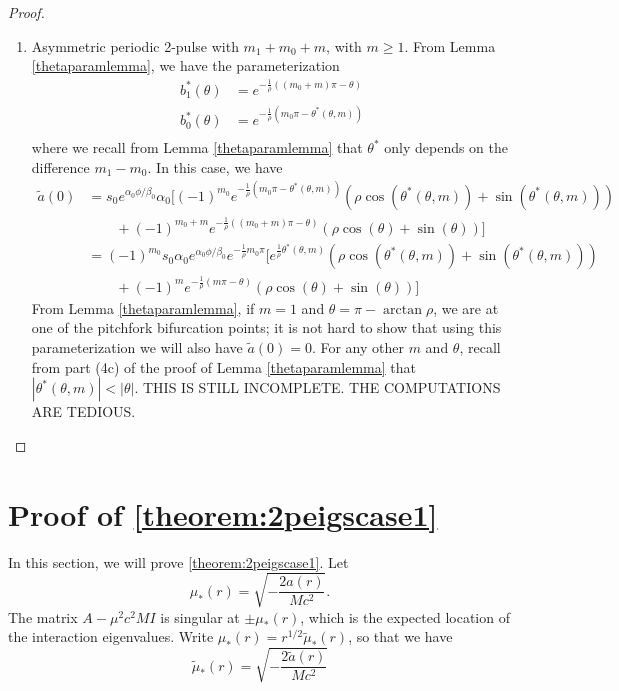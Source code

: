 \documentclass[thesis.tex]{subfiles}
\begin{document}
\begin{lemma}
\begin{proof}
\begin{enumerate}
\item Asymmetric periodic 2-pulse with $m_1 + m_0 + m$, with $m \geq 1$. From Lemma \ref{thetaparamlemma}, we have the parameterization
\begin{equation*}
\begin{aligned}
b_1^*(\theta) &= e^{-\frac{1}{\rho}((m_0 + m) \pi - \theta) } \\
b_0^*(\theta) &= e^{-\frac{1}{\rho}(m_0 \pi - \theta^*(\theta, m)) } \\
\end{aligned}
\end{equation*}
where we recall from Lemma \ref{thetaparamlemma} that $\theta^*$ only depends on the difference $m_1 - m_0$. In this case, we have
\begin{align*}
\tilde{a}(0) &= s_0 e^{\alpha_0 \phi/\beta_0} \alpha_0 \Big[ (-1)^{m_0} e^{-\frac{1}{\rho}(m_0 \pi - \theta^*(\theta, m))} \left( \rho \cos(\theta^*(\theta, m)) + \sin(\theta^*(\theta, m)) \right) \\
&\qquad + (-1)^{m_0 + m} e^{-\frac{1}{\rho}((m_0 + m) \pi - \theta) } ( \rho \cos(\theta) + \sin (\theta)) \Big] \\
&= (-1)^{m_0} s_0 \alpha_0 e^{\alpha_0 \phi/\beta_0} e^{-\frac{1}{\rho} m_0 \pi} \Big[ e^{\frac{1}{\rho} \theta^*(\theta, m)} \left( \rho \cos(\theta^*(\theta, m)) + \sin(\theta^*(\theta, m)) \right) \\
&\qquad + (-1)^{m} e^{-\frac{1}{\rho}(m \pi - \theta) } ( \rho \cos(\theta) + \sin (\theta)) \Big]
\end{align*}
From Lemma \ref{thetaparamlemma}, if $m = 1$ and $\theta = \pi - \arctan \rho$, we are at one of the pitchfork bifurcation points; it is not hard to show that using this parameterization we will also have $\tilde{a}(0) = 0$. For any other $m$ and $\theta$, recall from part (4c) of the proof of Lemma \ref{thetaparamlemma} that $|\theta^*(\theta, m)| < |\theta|$. 
THIS IS STILL INCOMPLETE. THE COMPUTATIONS ARE TEDIOUS.
\end{enumerate}
\end{proof}
\end{lemma}

\section{Proof of \cref{theorem:2peigscase1}}

In this section, we will prove \cref{theorem:2peigscase1}. Let
\begin{equation}\label{2pmustar}
\mu_*(r) = \sqrt{-\frac{2a(r)}{M c^2}}.
\end{equation}
The matrix $A - \mu^2 c^2 M I$ is singular at $\pm \mu_*(r)$, which is the expected location of the interaction eigenvalues. Write $\mu_*(r) = r^{1/2} \tilde{\mu}_*(r)$, so that we have
\begin{equation}\label{2ptildemustar}
\tilde{\mu}_*(r) = \sqrt{-\frac{2\tilde{a}(r)}{M c^2}}
\end{equation}
\end{document}
